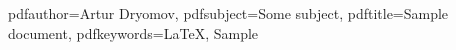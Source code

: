 

\hypersetup
{
  pdfauthor={Artur Dryomov},
  pdfsubject={Some subject},
  pdftitle={Sample document},
  pdfkeywords={LaTeX, Sample}
}



  



